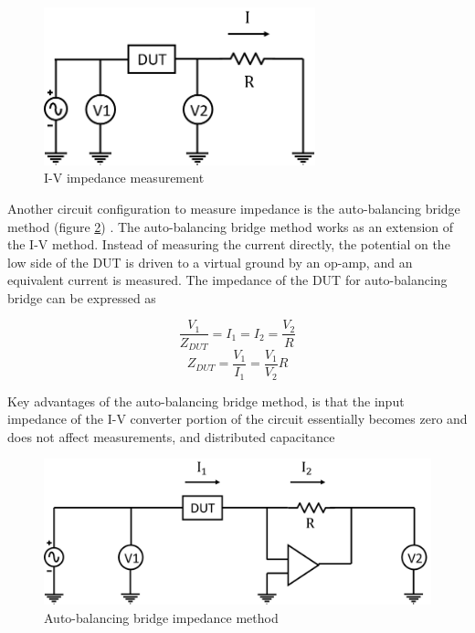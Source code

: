  \begin{figure}[ht]
    \centering
    \includegraphics[width=0.7\textwidth]{images/I-VMethod.png}
    \caption[I-V impedance measurement configuration]{I-V impedance measurement }
    \label{fig:IV_impedance_measurement}
\end{figure}

\par Another circuit configuration to measure impedance is the auto-balancing bridge method (figure \ref{fig:auto-balancing_bridge}) \cite{keysight_technologies_impedance_2015}. The auto-balancing bridge method works as an extension of the I-V method. Instead of measuring the current directly, the potential on the low side of the DUT is driven to a virtual ground by an op-amp, and an equivalent current is measured. The impedance of the DUT for auto-balancing bridge can be expressed as

\begin{equation}
    \frac{V_1}{Z_{DUT}} = I_1 = I_2 = \frac{V_2}{R}
\end{equation}
\begin{equation}
    Z_{DUT} = \frac{V_1}{I_1} = \frac{V_1}{V_2}R
\end{equation}

Key advantages of the auto-balancing bridge method, is that the input impedance of the I-V converter portion of the circuit essentially becomes zero and does not affect measurements, and distributed capacitance 

 \begin{figure}[ht]
    \centering
    \includegraphics[width=\textwidth]{images/autoBalancingBridge.png}
    \caption[Auto-balancing bridge impedance method]{Auto-balancing bridge impedance method}
    \label{fig:auto-balancing_bridge}
\end{figure}
 
